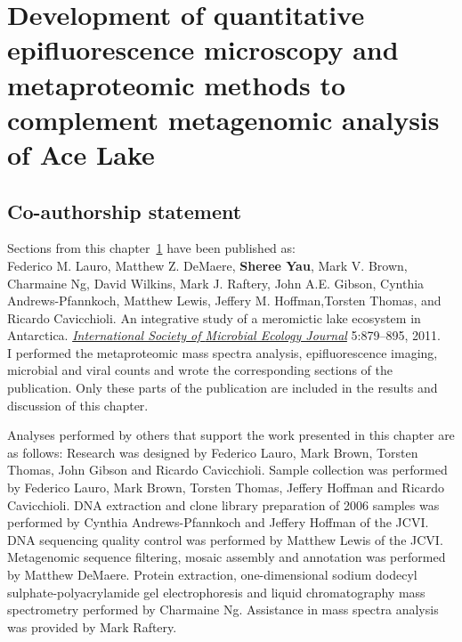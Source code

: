 \chapter[Development of methods to complement metagenomic analysis of Ace Lake]{Development of quantitative epifluorescence microscopy and metaproteomic methods to complement metagenomic analysis of Ace Lake}
\label{ch:ace}
\acresetall

\section*{Co-authorship statement}

Sections from this chapter~\ref{ch:ace} have been published as:\\

Federico M. Lauro, Matthew Z. DeMaere, \textbf{Sheree Yau}, Mark V. Brown, Charmaine Ng,
David Wilkins, Mark J. Raftery, John A.E. Gibson, Cynthia Andrews-Pfannkoch, Matthew Lewis,
Jeffery M. Hoffman,Torsten Thomas, and Ricardo Cavicchioli. 
An integrative study of a meromictic lake ecosystem in Antarctica.
\emph{\underline{International Society of }}
\emph{\underline{Microbial Ecology Journal}}
5:879--895, 2011.\\

I performed the metaproteomic mass spectra analysis, epifluorescence imaging,
microbial and viral counts and wrote the corresponding sections of the publication.
Only these parts of the publication are included in the results and discussion of this chapter.

Analyses performed by others that support the work presented in this chapter are as follows:
Research was designed by Federico Lauro, Mark Brown, Torsten Thomas, John Gibson and Ricardo Cavicchioli.
Sample collection was performed by Federico Lauro, Mark Brown, Torsten Thomas, Jeffery Hoffman and Ricardo Cavicchioli.
\textsc{DNA} extraction and clone library preparation of 2006 samples was performed by Cynthia Andrews-Pfannkoch and Jeffery Hoffman of the \ac{JCVI}.
\textsc{DNA} sequencing quality control was performed by Matthew Lewis of the \ac{JCVI}.
Metagenomic sequence filtering, mosaic assembly and annotation was performed by Matthew DeMaere.
Protein extraction, one-dimensional sodium dodecyl sulphate-polyacrylamide gel electrophoresis and liquid chromatography mass spectrometry performed by Charmaine Ng.
Assistance in mass spectra analysis was provided by Mark Raftery.
\newpage


